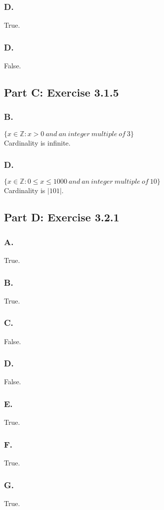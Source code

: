 \documentclass[titlepage]{article}\pagestyle{empty}
\begin{document}
\subsubsection*{D.} True.
\subsubsection*{D.} False.
\pagebreak
\subsection*{Part C: Exercise 3.1.5} 
\subsubsection*{B.} $\{x \in \mathbb{Z} : x > 0\ and \ an\ integer\ multiple\ of\ 3\}$ \\ Cardinality is infinite.
\subsubsection*{D.} $\{x \in \mathbb{Z} : 0 \leq x \leq 1000\ and \ an\ integer\ multiple\ of\ 10\}$ \\ Cardinality is $\vert 101 \vert.$
\subsection*{Part D: Exercise 3.2.1}
\subsubsection*{A.} True.
\subsubsection*{B.} True.
\subsubsection*{C.} False.
\subsubsection*{D.} False.
\subsubsection*{E.} True.
\subsubsection*{F.} True.
\subsubsection*{G.} True.
\end{document}
